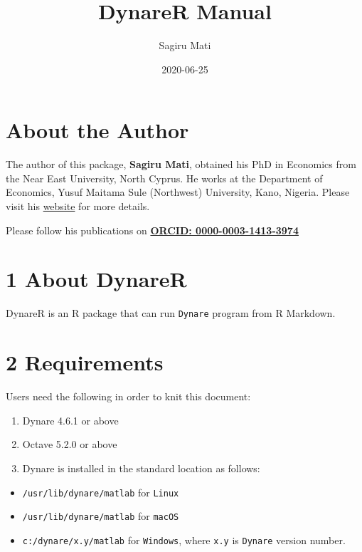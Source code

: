 \documentclass[
  letterpaper,
  DIV=11,
  numbers=noendperiod]{scrartcl}
\title{DynareR Manual}
\author{Sagiru Mati}
\date{2020-06-25}
\begin{document}
\maketitle
\ifdefined\Shaded\renewenvironment{Shaded}{\begin{tcolorbox}[enhanced, interior hidden, breakable, boxrule=0pt, sharp corners, borderline west={3pt}{0pt}{shadecolor}, frame hidden]}{\end{tcolorbox}}\fi

\hypertarget{about-the-author}{%
\section{About the Author}\label{about-the-author}}

The author of this package, \textbf{Sagiru Mati}, obtained his PhD in
Economics from the Near East University, North Cyprus. He works at the
Department of Economics, Yusuf Maitama Sule (Northwest) University,
Kano, Nigeria. Please visit his \href{https://smati.com.ng}{website} for
more details.

Please follow his publications on
\href{https://orcid.org/0000-0003-1413-3974}{\textbf{ORCID:
0000-0003-1413-3974}}

\hypertarget{about-dynarer}{%
\section{1 About DynareR}\label{about-dynarer}}

DynareR is an R package that can run \texttt{Dynare} program from R
Markdown.

\hypertarget{requirements}{%
\section{2 Requirements}\label{requirements}}

Users need the following in order to knit this document:

\begin{enumerate}
\def\labelenumi{\arabic{enumi}.}
\item
  Dynare 4.6.1 or above
\item
  Octave 5.2.0 or above
\item
  Dynare is installed in the standard location as follows:
\end{enumerate}

\begin{itemize}
\item
  \texttt{/usr/lib/dynare/matlab} for \texttt{Linux}
\item
  \texttt{/usr/lib/dynare/matlab} for \texttt{macOS}
\item
  \texttt{c:/dynare/x.y/matlab} for \texttt{Windows}, where \texttt{x.y}
  is \texttt{Dynare} version number.
\end{itemize}
\end{document}
